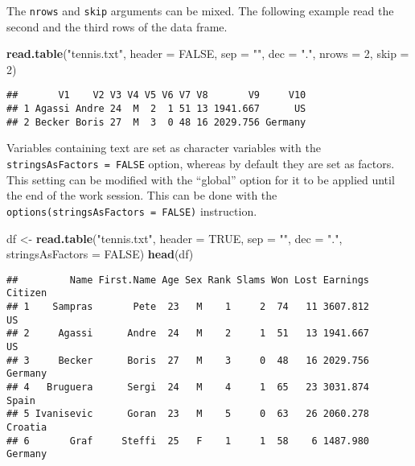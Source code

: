 \documentclass[]{book}
\newenvironment{Shaded}{\begin{snugshade}}{\end{snugshade}}
\newcommand{\KeywordTok}[1]{\textcolor[rgb]{0.13,0.29,0.53}{\textbf{{#1}}}}
\newcommand{\DataTypeTok}[1]{\textcolor[rgb]{0.13,0.29,0.53}{{#1}}}
\newcommand{\DecValTok}[1]{\textcolor[rgb]{0.00,0.00,0.81}{{#1}}}
\newcommand{\StringTok}[1]{\textcolor[rgb]{0.31,0.60,0.02}{{#1}}}
\newcommand{\OtherTok}[1]{\textcolor[rgb]{0.56,0.35,0.01}{{#1}}}
\newcommand{\NormalTok}[1]{{#1}}
\begin{document}
The \texttt{nrows} and \texttt{skip} arguments can be mixed. The
following example read the second and the third rows of the data frame.

\begin{Shaded}
\begin{Highlighting}[]
\KeywordTok{read.table}\NormalTok{(}\StringTok{"tennis.txt"}\NormalTok{, }\DataTypeTok{header =} \OtherTok{FALSE}\NormalTok{, }\DataTypeTok{sep =} \StringTok{""}\NormalTok{, }\DataTypeTok{dec =} \StringTok{"."}\NormalTok{, }\DataTypeTok{nrows =} \DecValTok{2}\NormalTok{, }\DataTypeTok{skip =} \DecValTok{2}\NormalTok{)}
\end{Highlighting}
\end{Shaded}

\begin{verbatim}
##       V1    V2 V3 V4 V5 V6 V7 V8       V9     V10
## 1 Agassi Andre 24  M  2  1 51 13 1941.667      US
## 2 Becker Boris 27  M  3  0 48 16 2029.756 Germany
\end{verbatim}

Variables containing text are set as character variables with the
\texttt{stringsAsFactors\ =\ FALSE} option, whereas by default they are
set as factors. This setting can be modified with the ``global'' option
for it to be applied until the end of the work session. This can be done
with the \texttt{options(stringsAsFactors\ =\ FALSE)} instruction.

\begin{Shaded}
\begin{Highlighting}[]
\NormalTok{df <-}\StringTok{ }\KeywordTok{read.table}\NormalTok{(}\StringTok{"tennis.txt"}\NormalTok{, }\DataTypeTok{header =} \OtherTok{TRUE}\NormalTok{, }\DataTypeTok{sep =} \StringTok{""}\NormalTok{, }\DataTypeTok{dec =} \StringTok{"."}\NormalTok{, }\DataTypeTok{stringsAsFactors =} \OtherTok{FALSE}\NormalTok{)}
\KeywordTok{head}\NormalTok{(df)}
\end{Highlighting}
\end{Shaded}

\begin{verbatim}
##         Name First.Name Age Sex Rank Slams Won Lost Earnings Citizen
## 1    Sampras       Pete  23   M    1     2  74   11 3607.812      US
## 2     Agassi      Andre  24   M    2     1  51   13 1941.667      US
## 3     Becker      Boris  27   M    3     0  48   16 2029.756 Germany
## 4   Bruguera      Sergi  24   M    4     1  65   23 3031.874   Spain
## 5 Ivanisevic      Goran  23   M    5     0  63   26 2060.278 Croatia
## 6       Graf     Steffi  25   F    1     1  58    6 1487.980 Germany
\end{verbatim}
\end{document}
